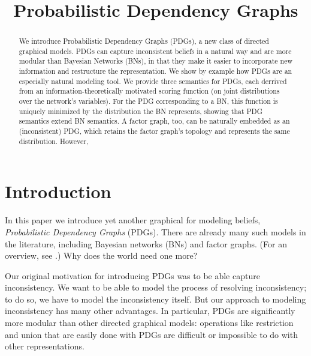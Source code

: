 \documentclass[letterpaper]{article} %
\title{Probabilistic Dependency Graphs}
\author{} %
\theoremstyle{plain}
\theoremstyle{definition}
\theoremstyle{remark}
\begin{document}
\maketitle
\begin{abstract}
We introduce Probabilistic Dependency Graphs (PDGs), a new class of
directed graphical models.   PDGs can capture inconsistent beliefs in a
natural way and are more modular than Bayesian Networks (BNs), in that
they make it easier to incorporate new information and restructure the  
representation.    We show by example how PDGs are an especially natural
modeling tool.
%
We provide three semantics for PDGs, each derrived from an information-theoretically motivated scoring function (on joint distributions over the network's variables). For the PDG corresponding to a BN, this function is uniquely minimized by the distribution the BN represents, showing that PDG semantics extend BN semantics. 
%
A factor graph, too, can be naturally embedded as an (inconsistent) PDG, which retains the factor graph's topology and represents the same distribution. However,    
\end{abstract}

\section{Introduction}

In this paper we introduce yet another graphical for modeling beliefs,
\emph{Probabilistic Dependency Graphs} (PDGs). There are already many
such models in the literature, including Bayesian networks (BNs) and
factor graphs. (For an overview, see \cite{KF09}.)
Why does the world need one more?  

Our original motivation for introducing PDGs was to be able capture
inconsistency. We want to be able to model the process of resolving
inconsistency; to do so, we have to model the inconsistency itself. But our
approach to modeling inconsistency has many other advantages. In particular,
PDGs are significantly more modular than other directed graphical models:
operations like restriction and union that are easily done with PDGs are
difficult or impossible to do with other representations.
\end{document}
